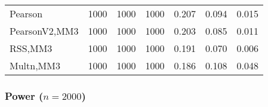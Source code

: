 \documentclass[
]{article}
\begin{document}
\begin{table}[H]
{\begin{tabular}[t]{lrrrrrr}
\hspace{1em}Pearson & 1000 & 1000 & 1000 & 0.207 & 0.094 & 0.015\\
\hspace{1em}PearsonV2,MM3 & 1000 & 1000 & 1000 & 0.203 & 0.085 & 0.011\\
\hspace{1em}RSS,MM3 & 1000 & 1000 & 1000 & 0.191 & 0.070 & 0.006\\
\hspace{1em}Multn,MM3 & 1000 & 1000 & 1000 & 0.186 & 0.108 & 0.048\\
\bottomrule
\end{tabular}}
\end{table}

\hypertarget{power-n2000-2}{%
\subsubsection{\texorpdfstring{Power
(\(n=2000\))}{Power (n=2000)}}\label{power-n2000-2}}
\end{document}

